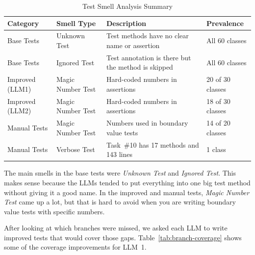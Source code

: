 \documentclass[12pt, a4paper]{article}
\begin{document}
\begin{table}[H]
\centering
\caption{Test Smell Analysis Summary}
\label{tab:test-smells}
\begin{tabularx}{\textwidth}{l l X l}
\toprule
\textbf{Category} & \textbf{Smell Type} & \textbf{Description} & \textbf{Prevalence} \\
\midrule
Base Tests & Unknown Test & Test methods have no clear name or assertion & All 60 classes \\
Base Tests & Ignored Test & Test annotation is there but the method is skipped & All 60 classes \\
Improved (LLM1) & Magic Number Test & Hard-coded numbers in assertions & 20 of 30 classes \\
Improved (LLM2) & Magic Number Test & Hard-coded numbers in assertions & 18 of 30 classes \\
Manual Tests & Magic Number Test & Numbers used in boundary value tests & 14 of 20 classes \\
Manual Tests & Verbose Test & Task~\#10 has 17 methods and 143 lines & 1 class \\
\bottomrule
\end{tabularx}
\end{table}

The main smells in the base tests were \textit{Unknown Test} and \textit{Ignored Test}. This makes sense because the LLMs tended to put everything into one big test method without giving it a good name. In the improved and manual tests, \textit{Magic Number Test} came up a lot, but that is hard to avoid when you are writing boundary value tests with specific numbers.

After looking at which branches were missed, we asked each LLM to write improved tests that would cover those gaps. Table~\ref{tab:branch-coverage} shows some of the coverage improvements for LLM~1.
\end{document}
